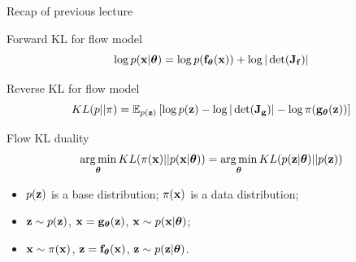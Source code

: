 \begin{frame}{Recap of previous lecture}
	\begin{block}{Forward KL for flow model}
	  	\vspace{-0.1cm}
		\[
			\log p(\mathbf{x}|\boldsymbol{\theta}) = \log p(\mathbf{f}_{\boldsymbol{\theta}}(\mathbf{x})) + \log  |\det (\mathbf{J}_{\mathbf{f}})|
		\]
		\vspace{-0.3cm}
	\end{block}
	\begin{block}{Reverse KL for flow model}
  		\vspace{-0.1cm}
		\[
			KL(p || \pi)  = \mathbb{E}_{p(\mathbf{z})} \left[  \log p(\mathbf{z}) -  \log |\det (\mathbf{J}_{\mathbf{g}})| - \log \pi(\mathbf{g}_{\boldsymbol{\theta}}(\mathbf{z})) \right]
		\]
		\vspace{-0.5cm}
	\end{block}
	\begin{block}{Flow KL duality}
	  	\vspace{-0.3cm}
		\[
			\operatorname*{arg\,min}_{\boldsymbol{\theta}} KL(\pi(\mathbf{x}) || p(\mathbf{x} | \boldsymbol{\theta})) = \operatorname*{arg\,min}_{\boldsymbol{\theta}} KL(p(\mathbf{z} | \boldsymbol{\theta}) || p(\mathbf{z}))
		\]
		\vspace{-0.3cm}
		\begin{itemize}
			\item $p(\mathbf{z})$ is a base distribution; $\pi(\mathbf{x})$ is a data distribution;
			\item $\mathbf{z} \sim p(\mathbf{z})$, $\mathbf{x} = \mathbf{g}_{\boldsymbol{\theta}}(\mathbf{z})$, $\mathbf{x} \sim p(\mathbf{x}| \boldsymbol{\theta})$;
			\item $\mathbf{x} \sim \pi(\mathbf{x})$, $\mathbf{z} = \mathbf{f}_{\boldsymbol{\theta}}(\mathbf{x})$, $\mathbf{z} \sim p(\mathbf{z} | \boldsymbol{\theta})$.
		\end{itemize}
	\end{block}
\end{frame}
